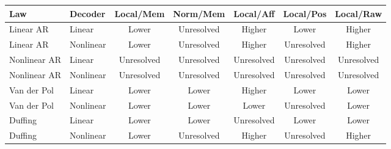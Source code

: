 \begin{tabular}{llccccc}
\toprule
Law & Decoder & Local/Mem & Norm/Mem & Local/Aff & Local/Pos & Local/Raw \\
\midrule
Linear AR & Linear & Lower & Unresolved & Higher & Lower & Higher \\
Linear AR & Nonlinear & Lower & Unresolved & Higher & Unresolved & Higher \\
Nonlinear AR & Linear & Unresolved & Unresolved & Unresolved & Unresolved & Unresolved \\
Nonlinear AR & Nonlinear & Unresolved & Unresolved & Unresolved & Unresolved & Unresolved \\
Van der Pol & Linear & Lower & Lower & Higher & Lower & Lower \\
Van der Pol & Nonlinear & Lower & Lower & Lower & Unresolved & Lower \\
Duffing & Linear & Lower & Lower & Unresolved & Lower & Lower \\
Duffing & Nonlinear & Lower & Unresolved & Higher & Unresolved & Higher \\
\bottomrule
\end{tabular}
